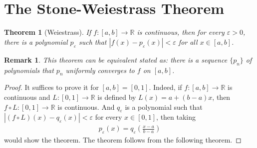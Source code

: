 \documentclass[11pt]{book}
\newtheorem{theorem}{Theorem}[chapter]
\newtheorem{remark}{Remark}[chapter]
\theoremstyle{definition}
\numberwithin{equation}{chapter}
\begin{document}
\medskip






\section{The Stone-Weiestrass Theorem}


\begin{theorem}[Weiestrass]\label{th_619}
If $f: [a,b] \to \mathbb{R}$ is continuous, then for every $\varepsilon > 0$, there is a polynomial $p_{\varepsilon}$ such that $\left|f(x) - p_{\varepsilon}(x)\right| < \varepsilon$ for all $x \in [a,b]$.
\end{theorem}

\begin{remark}
This theorem can be equivalent stated as: there is a sequence $\{p_n\}$ of polynomials that $p_n$ uniformly converges to $f$ on $[a,b]$.
\end{remark}

\begin{proof}
It suffices to prove it for $[a,b] = [0,1]$. Indeed, if $f: [a,b] \to \mathbb{R}$ is continuous and $L:[0,1] \to \mathbb{R}$ is defined by $L(x) = a + (b-a)x$, then $f \circ L:[0,1] \to \mathbb{R}$ is continuous. And $q_{\varepsilon}$ is a polynomial such that $\left|(f \circ L)(x) - q_{\varepsilon}(x)\right| < \varepsilon$ for every $x \in [0,1]$, then taking 
\begin{align*}
    p_{\varepsilon}(x) = q_{\varepsilon} \left(\frac{x - a}{b - a}\right)
\end{align*}
would show the theorem. The theorem follows from the following theorem.
\end{proof}

\medskip
\end{document}

